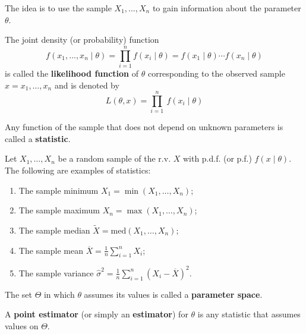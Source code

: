 \documentclass[12pt,a4paper]{report}
\begin{document}
The idea is to use the sample $X_1, \ldots, X_n$ to gain information about the parameter $\theta$. 

\begin{definition}
    The joint density (or probability) function 
    \begin{equation*}
        f(x_1, \ldots, x_n \mid \theta) = \prod_{i=1}^n f(x_i \mid \theta) = f(x_1 \mid \theta) \cdots f(x_n \mid \theta)
    \end{equation*}
    is called the \textbf{likelihood function} of $\theta$ corresponding to the observed sample $x = x_1, \ldots, x_n$ and is denoted by 
    \begin{equation*}
        L(\theta, x) = \prod_{i=1}^{n} ~f(x_i \mid \theta)
    \end{equation*}
\end{definition}

\begin{definition}[Statistic]
    Any function of the sample that does not depend on unknown parameters is called a \textbf{statistic}.
\end{definition}

\begin{example}
    Let $X_1, \ldots, X_n$ be a random sample of the r.v. $X$ with p.d.f. (or p.f.) $f(x \mid \theta)$. The following are examples of statistics:
    \begin{enumerate}
        \item The sample minimum $X_1 = \min (X_1, \ldots, X_n)$;
        \item The sample maximum $X_n = \max (X_1, \ldots, X_n)$;
        \item The sample median $\tilde{X} = \text{med} (X_1, \ldots, X_n)$;
        \item The sample mean $\overline{X} = \frac{1}{n} \sum_{i=1}^{n} X_i$; 
        \item The sample variance $\hat{\sigma}^2 = \frac{1}{n} \sum_{i=1}^{n} (X_i - \overline{X})^2$.
    \end{enumerate}
\end{example}

\begin{definition}
    The set $\Theta$ in which $\theta$ assumes its values is called a \textbf{parameter space}.
\end{definition}

\begin{definition}
    A \textbf{point estimator} (or simply an \textbf{estimator}) for $\theta$ is any statistic that assumes values on $\Theta$.
\end{definition}
\end{document}
